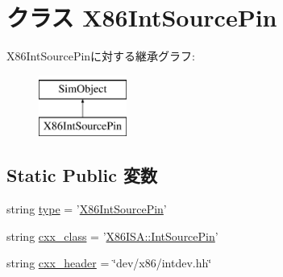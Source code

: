 \hypertarget{classX86IntPin_1_1X86IntSourcePin}{
\section{クラス X86IntSourcePin}
\label{classX86IntPin_1_1X86IntSourcePin}
}
X86IntSourcePinに対する継承グラフ:\begin{figure}[H]
\begin{center}
\leavevmode
\includegraphics[height=2cm]{classX86IntPin_1_1X86IntSourcePin}
\end{center}
\end{figure}
\subsection*{Static Public 変数}
\begin{DoxyCompactItemize}
\item 
string \hyperlink{classX86IntPin_1_1X86IntSourcePin_acce15679d830831b0bbe8ebc2a60b2ca}{type} = '\hyperlink{classX86IntPin_1_1X86IntSourcePin}{X86IntSourcePin}'
\item 
string \hyperlink{classX86IntPin_1_1X86IntSourcePin_a58cd55cd4023648e138237cfc0822ae3}{cxx\_\-class} = '\hyperlink{classX86ISA_1_1IntSourcePin}{X86ISA::IntSourcePin}'
\item 
string \hyperlink{classX86IntPin_1_1X86IntSourcePin_a17da7064bc5c518791f0c891eff05fda}{cxx\_\-header} = \char`\"{}dev/x86/intdev.hh\char`\"{}
\end{DoxyCompactItemize}


